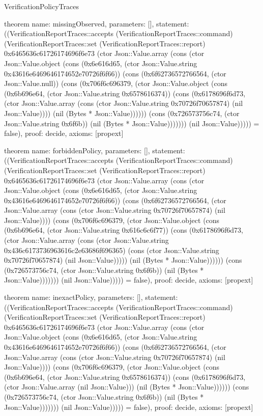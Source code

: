\begin{lexlean}{VerificationPolicyTraces}
\begin{semanticmodule}
theorem{
  name: missingObserved,
  parameters: [],
  statement: ((VerificationReportTraces::accepts (VerificationReportTraces::command) (VerificationReportTraces::set (VerificationReportTraces::report) 0x6465636c61726174696f6e73 (ctor Json::Value.array (cons (ctor Json::Value.object (cons (0x6e616d65, (ctor Json::Value.string 0x43616e6469646174652e70726f6f66)) (cons (0x6f62736572766564, (ctor Json::Value.null)) (cons (0x706f6c696379, (ctor Json::Value.object (cons (0x6b696e64, (ctor Json::Value.string 0x6578616374)) (cons (0x6178696f6d73, (ctor Json::Value.array (cons (ctor Json::Value.string 0x70726f70657874) (nil Json::Value)))) (nil (Bytes * Json::Value)))))) (cons (0x726573756c74, (ctor Json::Value.string 0x6f6b)) (nil (Bytes * Json::Value))))))) (nil Json::Value))))) = false),
  proof: decide{},
  axioms: [propext]
}

theorem{
  name: forbiddenPolicy,
  parameters: [],
  statement: ((VerificationReportTraces::accepts (VerificationReportTraces::command) (VerificationReportTraces::set (VerificationReportTraces::report) 0x6465636c61726174696f6e73 (ctor Json::Value.array (cons (ctor Json::Value.object (cons (0x6e616d65, (ctor Json::Value.string 0x43616e6469646174652e70726f6f66)) (cons (0x6f62736572766564, (ctor Json::Value.array (cons (ctor Json::Value.string 0x70726f70657874) (nil Json::Value)))) (cons (0x706f6c696379, (ctor Json::Value.object (cons (0x6b696e64, (ctor Json::Value.string 0x616c6c6f77)) (cons (0x6178696f6d73, (ctor Json::Value.array (cons (ctor Json::Value.string 0x436c6173736963616c2e63686f696365) (cons (ctor Json::Value.string 0x70726f70657874) (nil Json::Value))))) (nil (Bytes * Json::Value)))))) (cons (0x726573756c74, (ctor Json::Value.string 0x6f6b)) (nil (Bytes * Json::Value))))))) (nil Json::Value))))) = false),
  proof: decide{},
  axioms: [propext]
}

theorem{
  name: inexactPolicy,
  parameters: [],
  statement: ((VerificationReportTraces::accepts (VerificationReportTraces::command) (VerificationReportTraces::set (VerificationReportTraces::report) 0x6465636c61726174696f6e73 (ctor Json::Value.array (cons (ctor Json::Value.object (cons (0x6e616d65, (ctor Json::Value.string 0x43616e6469646174652e70726f6f66)) (cons (0x6f62736572766564, (ctor Json::Value.array (cons (ctor Json::Value.string 0x70726f70657874) (nil Json::Value)))) (cons (0x706f6c696379, (ctor Json::Value.object (cons (0x6b696e64, (ctor Json::Value.string 0x6578616374)) (cons (0x6178696f6d73, (ctor Json::Value.array (nil Json::Value))) (nil (Bytes * Json::Value)))))) (cons (0x726573756c74, (ctor Json::Value.string 0x6f6b)) (nil (Bytes * Json::Value))))))) (nil Json::Value))))) = false),
  proof: decide{},
  axioms: [propext]
}






\end{semanticmodule}
\end{lexlean}
